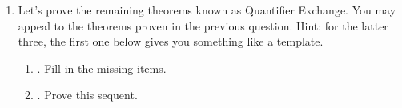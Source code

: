 \begin{enumerate}
\begin{enumerate}
{\begin{argumentN}[1]

\end{argumentN}
}
\end{enumerate}

\newpage
\item Let's prove the remaining theorems known as Quantifier Exchange. You may 
 appeal to the theorems proven in the previous question. Hint: for the latter 
 three, the first one below gives you something like a template.

\begin{enumerate}
 \setlength{\itemsep}{1em}

   \item {}. Fill in the missing items.

\begin{argumentN}[1]





{}


\end{argumentN}

   \item {}. Prove this sequent.

	\opts{
 \dotline
 \dotline
 \dotline
 \dotline
 \dotline
 \dotline
 \dotline
 \dotline
 \dotline
}
{
\begin{argumentN}[1]







\end{argumentN}}
\end{enumerate}
\end{enumerate}
